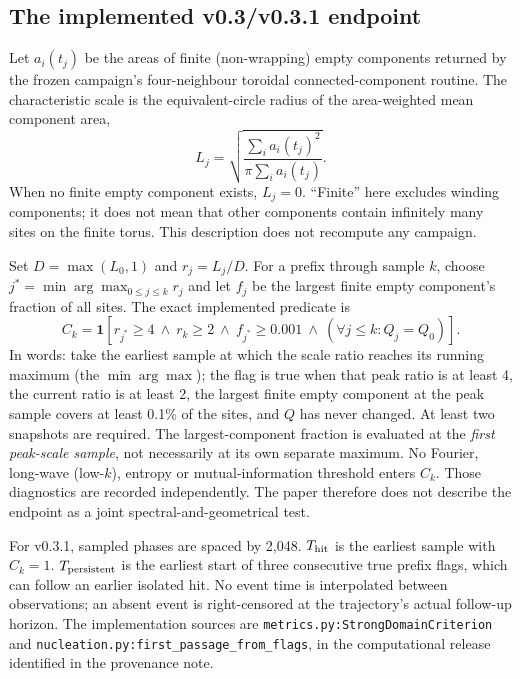 \documentclass[11pt,a4paper]{article}
\newcommand{\code}[1]{\texttt{#1}}
\begin{document}
\subsection{The implemented v0.3/v0.3.1 endpoint}
Let $a_i(t_j)$ be the areas of finite (non-wrapping) empty components returned by the frozen campaign's four-neighbour toroidal connected-component routine. The characteristic scale is the equivalent-circle radius of the area-weighted mean component area,
\begin{equation}
 L_j=\sqrt{\frac{\sum_i a_i(t_j)^2}{\pi\sum_i a_i(t_j)}}.
\end{equation}
When no finite empty component exists, $L_j=0$. ``Finite'' here excludes winding components; it does not mean that other components contain infinitely many sites on the finite torus. This description does not recompute any campaign.

Set $D=\max(L_0,1)$ and $r_j=L_j/D$. For a prefix through sample $k$, choose $j^*=\min\arg\max_{0\leq j\leq k}r_j$ and let $f_j$ be the largest finite empty component's fraction of all sites. The exact implemented predicate is
\begin{equation}
 C_k=\mathbf{1}[r_{j^*}\geq4\ \wedge\ r_k\geq2\ \wedge\ f_{j^*}\geq0.001
 \ \wedge\ (\forall j\leq k: Q_j=Q_0)].
\end{equation}
In words: take the earliest sample at which the scale ratio reaches its running maximum (the $\min\arg\max$); the flag is true when that peak ratio is at least 4, the current ratio is at least 2, the largest finite empty component at the peak sample covers at least 0.1\% of the sites, and $Q$ has never changed. At least two snapshots are required. The largest-component fraction is evaluated at the \emph{first peak-scale sample}, not necessarily at its own separate maximum. No Fourier, long-wave (low-$k$), entropy or mutual-information threshold enters $C_k$. Those diagnostics are recorded independently. The paper therefore does not describe the endpoint as a joint spectral-and-geometrical test.

For v0.3.1, sampled phases are spaced by 2,048. $T_{\rm hit}$ is the earliest sample with $C_k=1$. $T_{\rm persistent}$ is the earliest start of three consecutive true prefix flags, which can follow an earlier isolated hit. No event time is interpolated between observations; an absent event is right-censored at the trajectory's actual follow-up horizon. The implementation sources are \code{metrics.py:StrongDomainCriterion} and \code{nucleation.py:first\_passage\_from\_flags}, in the computational release identified in the provenance note.
\end{document}
